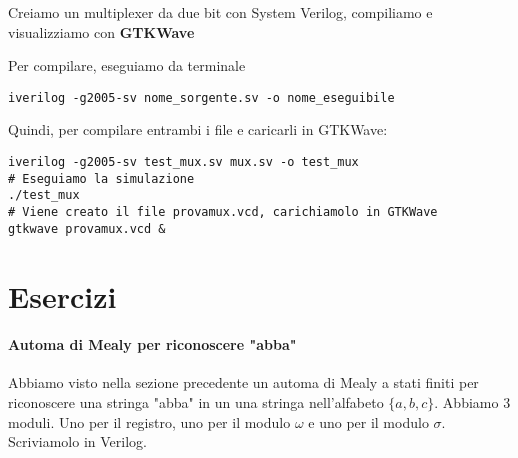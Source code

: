 Creiamo un multiplexer da due bit con System Verilog, compiliamo e visualizziamo con \textbf{GTKWave}


Per compilare, eseguiamo da terminale 
\begin{lstlisting}[style={bash}]
iverilog -g2005-sv nome_sorgente.sv -o nome_eseguibile
\end{lstlisting}

Quindi, per compilare entrambi i file e caricarli in GTKWave:
\begin{lstlisting}[style={bash}]
iverilog -g2005-sv test_mux.sv mux.sv -o test_mux
# Eseguiamo la simulazione
./test_mux
# Viene creato il file provamux.vcd, carichiamolo in GTKWave
gtkwave provamux.vcd &
\end{lstlisting}



\clearpage

\section{Esercizi}

\paragraph{Automa di Mealy per riconoscere "abba"}
Abbiamo visto nella sezione precedente un automa di Mealy a stati finiti per riconoscere una stringa "abba" in un una stringa nell'alfabeto $ \{a,b,c\} $.
Abbiamo 3 moduli. Uno per il registro, uno per il modulo $ \omega $ e uno per il modulo $ \sigma $. Scriviamolo in Verilog.


